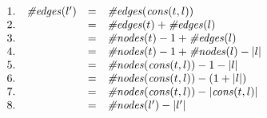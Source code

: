 \documentclass[]{exam}
\begin{document}
\begin{questions}
\begin{displaymath}
\begin{array}{llll}
1. & \mbox{\it \#edges\/}(l') & = &\mbox{\it \#edges\/}(\mbox{\it cons\/}(t,l)) \\
2. &  & = & \mbox{\it \#edges\/}(t) + \mbox{\it \#edges\/}(l) \\
3. & 	& = & \mbox{\it \#nodes\/}(t) - 1 + \mbox{\it \#edges\/}(l) \\
4. & 	& = & \mbox{\it \#nodes\/}(t) - 1 + \mbox{\it \#nodes\/}(l) - |l| \\
5. & 	& = & \mbox{\it \#nodes\/}(\mbox{\it cons\/}(t,l)) - 1 - |l| \\
6. & 	& = & \mbox{\it \#nodes\/}(\mbox{\it cons\/}(t,l)) - (1 + |l|) \\
7. & 	& = & \mbox{\it \#nodes\/}(\mbox{\it cons\/}(t,l)) - |\mbox{\it cons\/}(t,l)|\\
8. & 	& = & \mbox{\it \#nodes\/}(l') - |l'|
\end{array}
\end{displaymath}


%
%
%
%



\end{questions}
\end{document}
